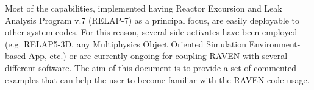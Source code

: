 
%
Most of the capabilities, implemented having Reactor Excursion and Leak Analysis Program v.7 
(RELAP-7) as a principal focus, are
easily deployable to other system codes.
%
For this reason, several side activates have been employed (e.g.  RELAP5-3D, any Multiphysics Object Oriented 
Simulation Environment-based App, etc.)
or are currently ongoing for coupling RAVEN with several different software.
%
The aim of this document is to provide a set of commented examples that can help the user to become familiar 
with the RAVEN code usage.
